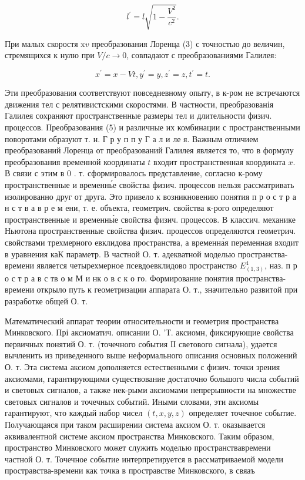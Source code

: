 \documentclass[10pt]{article}
\begin{document}
\[

l^{\prime}=l \sqrt{1-\frac{V^{2}}{c^{2}}} .

\]



При малых скоростя $\mathrm{x} v$ преобразования Лоренца (3) с точностью до величин, стремящихся к нулю при $V / c \rightarrow 0$, совпадают с преобразованиями Галилея:



\[

x^{\prime}=x-V t, y^{\prime}=y, z^{\prime}=z, t^{\prime}=t .

\]



Эти преобразования соответствуют повседневному опыту, в к-ром не встречаются движения тел с релятивистскими скоростями. В частности, преобразованія Галилея сохраняют пространственные размеры тел и длительности физич. процессов. Преобразования (5) и различные их комбинации с пространственными поворотами образуют т. н. Г р у п п у Г а л и ле я. Важным отличием преобразований Лоренца от преобразований Галилея является то, что в формулу преобразования временной координаты $t$ входит пространственная координата $x$. В связи с этим в 0 . т. сформировалось представление, согласно к-рому пространственные и временнь́е свойства физич. процессов нельзя рассматривать изолированно друг от друга. Это привело к возникновению понятия п р о с т р а н с т в а в р е м ени, т. е. объекта, геометрич. свойства к-рого определяют пространственные и временны́е свойства физич. процессов. В классич. механике Ньютона пространственные свойства физич. процессов определяются геометрич. свойствами трехмерного евклидова пространства, а временна́я переменная входит в уравнения каК параметр. В частной О. т. адекватной моделью пространства-времени является четырехмерное псевдоевклидово пространство $E_{(1,3)}^{4}$, наз. п р о с т р а в с тв о м М и нк о в с к о го. Формирование понятия пространства-времени открыло путь к геометризации аппарата О. т., значительно развитой при разработке общей О. т.



Математический аппарат теории относительности и геометрия пространства Минковского. Прі аксиоматич. описании О. 'Т. аксиомн, фиксирующие свойства первичных понятий О. т. (точечного события ІІ светового сигнала), удается вычленить из приведенного выше неформального описания основных положений О. т. Эта система аксиом дополняется естественными с физич. точки зрения аксиомами, гарантирующими существование достаточно большого числа событий и световых сигналов, а также нек-рыми аксиомами непрерывности на множестве световых сигналов и точечных событий. Иными словами, эти аксиомы гарантируют, что каждый набор чисел $(t, x, y, z)$ определяет точечное событие. Получающаяся при таком расширении система аксиом О. т. оказывается әквивалентной системе аксиом пространства Минковского. Таким образом, пространство Минковского может служить моделью пространствавремени частной О. т. Точечное событие интерпретируется в рассматриваемой модели простравства-времени как точка в простравстве Минковского, в свяаъ
\end{document}

